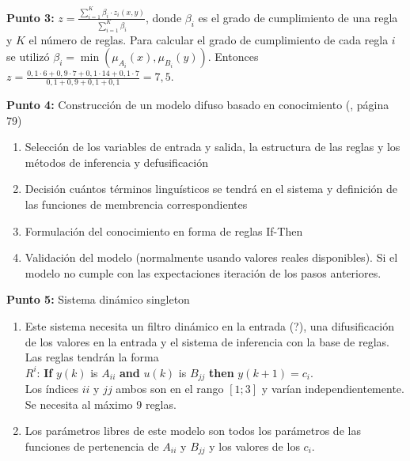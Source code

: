 \documentclass[10pt,onecolumn,twoside,letterpaper]{article}
\begin{document}
\par{\bf \large Punto 3:} $z = \frac{\sum_{i=1}^{K}\beta_i\cdot z_i(x,y)}{\sum_{i=1}^{K} \beta_i}$, donde $\beta_i$ es el grado de cumplimiento de una regla y $K$ el número de reglas. Para calcular el grado de cumplimiento de cada regla $i$ se utilizó $\beta_i=\min(\mu_{A_i}(x),\mu_{B_i}(y))$. Entonces $z= \frac{0,1\cdot 6+0,9\cdot 7+0,1\cdot 14+0,1\cdot 7}{0,1+0,9+0,1+0,1}=7,5$.\\

\par{\bf \large Punto 4:} Construcción de un modelo difuso basado en conocimiento (\cite{Babuska1999}, página 79)\\
\begin{enumerate}
\item Selección de los variables de entrada y salida, la estructura de las reglas y los métodos de inferencia y defusificación
\item Decisión cuántos términos linguísticos se tendrá en el sistema y definición de las funciones de membrencia correspondientes
\item Formulación del conocimiento en forma de reglas If-Then
\item Validación del modelo (normalmente usando valores reales disponibles). Si el modelo no cumple con las expectaciones iteración de los pasos anteriores.
\end{enumerate}

\par{\bf \large Punto 5:} Sistema dinámico singleton
\begin{enumerate}
\item Este sistema necesita un filtro dinámico en la entrada (?), una difusificación de los valores en la entrada y el sistema de inferencia con la base de reglas. Las reglas tendrán la forma\\
$R^{i}$: \textbf{If} $y(k)$ is $A_{ii}$ \textbf{and} $u(k)$ is $B_{jj}$ \textbf{then} $y(k+1)=c_i$.\\Los índices $ii$ y $jj$ ambos son en el rango $[1;3]$ y varían independientemente. Se necesita al máximo 9 reglas.
\item Los parámetros libres de este modelo son todos los parámetros de las funciones de pertenencia de $A_{ii}$ y $B_{jj}$ y los valores de los $c_i$.
\end{enumerate}
\end{document}
